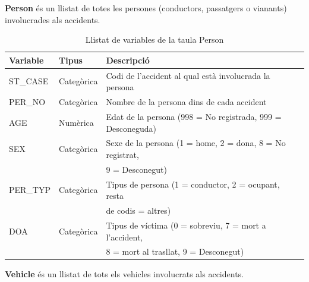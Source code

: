 \documentclass[12pt,longbibliography]{article}
\theoremstyle{definition}
\theoremstyle{remark}
\begin{document}
\textbf{Person} és un llistat de totes les persones (conductors, passatgers o vianants) involucrades als accidents.

\begin{table}[H]
\centering
\begin{tabular}{|l|l|l|}
\hline
\textbf{Variable} & \textbf{Tipus} & \textbf{Descripció}                                                       \\\hline
ST\_CASE           & Categòrica     & Codi de l’accident al qual està involucrada la persona                    \\
PER\_NO             & Categòrica     & Nombre de la persona dins de cada accident                                \\
AGE                   & Numèrica       & Edat de la persona (998 = No registrada, 999 = Desconeguda)               \\
SEX                   & Categòrica     & Sexe de la persona (1 = home, 2 = dona, 8 = No registrat,  \\
                          &                        &  9 = Desconegut) \\
PER\_TYP           & Categòrica     & Tipus de persona (1 = conductor, 2 = ocupant, resta    \\
                          &                        &  de codis = altres)    \\
DOA                   & Categòrica      & Tipus de víctima (0 = sobreviu, 7 = mort a l’accident, \\
                          &                         & 8 = mort al trasllat, 9 = Desconegut) \\ \hline
\end{tabular}
\caption{\label{persones-table}Llistat de variables de la taula Person}
\end{table}


\textbf{Vehicle} és un llistat de tots els vehicles involucrats als accidents.
\end{document}
